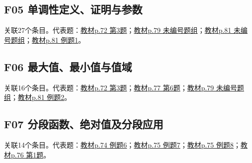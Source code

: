\par\medskip\noindent\begin{minipage}{\linewidth}\subsection{F05 单调性定义、证明与参数}关联27个条目。代表题：\hyperref[XJ-B1-C03-PR-P072-Y1416]{教材p.72 第3题}；\hyperref[XJ-B1-C03-TH-P079-Y0868]{教材p.79 未编号题组}；\hyperref[XJ-B1-C03-TH-P081-Y0178]{教材p.81 未编号题组}；\hyperref[XJ-B1-C03-EX-P081-Y0375]{教材p.81 例题1}。\end{minipage}\par
\par\medskip\noindent\begin{minipage}{\linewidth}\subsection{F06 最大值、最小值与值域}关联16个条目。代表题：\hyperref[XJ-B1-C03-PR-P072-Y1416]{教材p.72 第3题}；\hyperref[XJ-B1-C03-HW-P077-Y0601]{教材p.77 第6题}；\hyperref[XJ-B1-C03-TH-P079-Y0868]{教材p.79 未编号题组}；\hyperref[XJ-B1-C03-EX-P081-Y1313]{教材p.81 例题2}。\end{minipage}\par
\par\medskip\noindent\begin{minipage}{\linewidth}\subsection{F07 分段函数、绝对值及分段应用}关联14个条目。代表题：\hyperref[XJ-B1-C03-EX-P074-Y0394]{教材p.74 例题6}；\hyperref[XJ-B1-C03-EX-P075-Y0177]{教材p.75 例题7}；\hyperref[XJ-B1-C03-EX-P075-Y0639]{教材p.75 例题8}；\hyperref[XJ-B1-C03-PR-P076-Y0217]{教材p.76 第1题}。\end{minipage}\par

